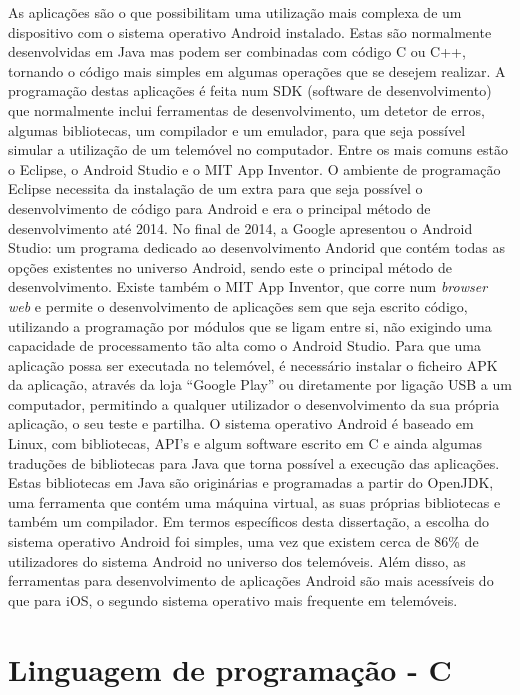 As aplicações são o que possibilitam uma utilização mais complexa de um dispositivo com o sistema operativo Android instalado.
Estas são normalmente desenvolvidas em Java mas podem ser combinadas com código C ou C++, tornando o código mais simples em algumas operações que se desejem realizar.
A programação destas aplicações é feita num SDK (software de desenvolvimento) que normalmente inclui ferramentas de desenvolvimento, um detetor de erros, algumas bibliotecas, um compilador e um emulador, para que seja possível simular a utilização de um telemóvel no computador.
Entre os mais comuns estão o Eclipse, o Android Studio e o MIT App Inventor.
O ambiente de programação Eclipse necessita da instalação de um extra para que seja possível o desenvolvimento de código para Android e era o principal método de desenvolvimento até 2014.
No final de 2014, a Google apresentou o Android Studio: um programa dedicado ao desenvolvimento Andorid que contém todas as opções existentes no universo Android, sendo este o principal método de desenvolvimento.
Existe também o MIT App Inventor, que corre num \emph{browser web} e permite o desenvolvimento de aplicações sem que seja escrito código, utilizando a programação por módulos que se ligam entre si, não exigindo uma capacidade de processamento tão alta como o Android Studio.
Para que uma aplicação possa ser executada no telemóvel, é necessário instalar o ficheiro APK da aplicação, através da loja ``Google Play'' ou diretamente por ligação USB a um computador, permitindo a qualquer utilizador o desenvolvimento da sua própria aplicação, o seu teste e partilha.
O sistema operativo Android é baseado em Linux, com bibliotecas, API's e algum software escrito em C e ainda algumas traduções de bibliotecas para Java que torna possível a execução das aplicações.
Estas bibliotecas em Java são originárias e programadas a partir do OpenJDK, uma ferramenta que contém uma máquina virtual, as suas próprias bibliotecas e também um compilador.
Em termos específicos desta dissertação, a escolha do sistema operativo Android foi simples, uma vez que existem cerca de 86\% de utilizadores do sistema Android no universo dos telemóveis.
Além disso, as ferramentas para desenvolvimento de aplicações Android são mais acessíveis do que para iOS, o segundo sistema operativo mais frequente em telemóveis.

\section{Linguagem de programação - C}
\label{sec:C}


